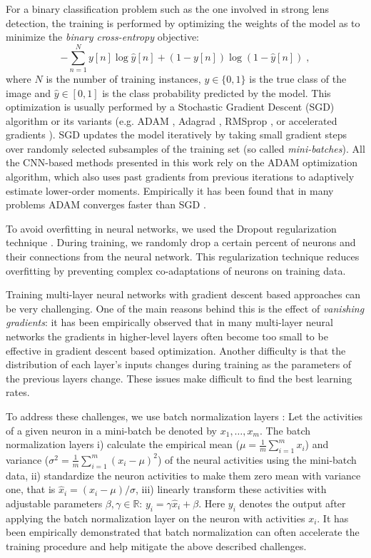 \documentclass[useAMS,usenatbib]{mnras}
\begin{document}
For a binary classification problem such as the one involved in strong lens detection, the training is performed by optimizing the weights of the model as to minimize the \textit{binary cross-entropy} objective:
\begin{equation}
	- \sum_{n=1}^{N} y[n] \log \hat{y}[n] + (1 - y[n])\log(1 - \hat{y}[n]) \;,
\end{equation}
where $N$ is the number of training instances, $y \in \{0,1\}$ is the true class of the image and $\hat{y} \in [0,1]$ is the class probability predicted by the model. This optimization is usually performed by a Stochastic Gradient Descent (SGD) algorithm or its variants (e.g. ADAM \citep{Kingma_2014}, Adagrad \citep{duchi12adaptive}, RMSprop \citep{Tieleman12RMSProp}, or accelerated gradients \citep{nesterov83method}). SGD updates the model iteratively by taking small gradient steps over randomly selected subsamples of the training set (so called \textit{mini-batches}). All the CNN-based methods presented in this work rely on the ADAM optimization algorithm, which also uses past gradients from previous iterations to adaptively estimate lower-order moments. Empirically it has been found that in many problems ADAM converges faster than SGD \citep{Ruder16overview}.

To avoid overfitting in neural networks, we used the Dropout regularization technique \citep{2012arXiv1207.0580H,JMLR:v15:srivastava14a}. During training, we randomly drop a certain percent of neurons and their connections from the neural
network. This regularization technique reduces overfitting  by preventing complex co-adaptations of neurons on training data. 

Training multi-layer neural networks with gradient descent based approaches can be very challenging. One of the main reasons behind this is the effect of \textit{vanishing gradients}: it has been empirically observed that in many multi-layer neural networks the gradients in higher-level layers often become too small to be effective in gradient descent based optimization. Another difficulty is that the distribution of each layer’s inputs changes during training as the parameters of the previous layers change. These issues make difficult to find the best learning rates.

To address these challenges, we use batch normalization layers \citep{batch_norm}: Let the activities of a given neuron in a mini-batch be denoted by $x_1,\ldots,x_m$. The batch normalization layers i) calculate the empirical mean ($\mu = \frac{1}{m}\sum_{i=1}^m x_i $) and variance ($\sigma^2 = \frac{1}{m}\sum_{i=1}^m (x_i-\mu)^2 $) of the neural activities using the mini-batch data, ii) standardize the neuron activities to make them zero mean with variance one, that is $\hat x_i = (x_i-\mu)/\sigma$, iii) linearly transform these activities with adjustable parameters $\beta, \gamma \in \mathbb{R}$: $y_i=\gamma\hat x_i +\beta$. Here $y_i$ denotes the output after applying the batch normalization layer on the neuron with activities $x_i$. It has been empirically demonstrated that batch normalization can often accelerate the training procedure and help mitigate the above described challenges.
\end{document}
